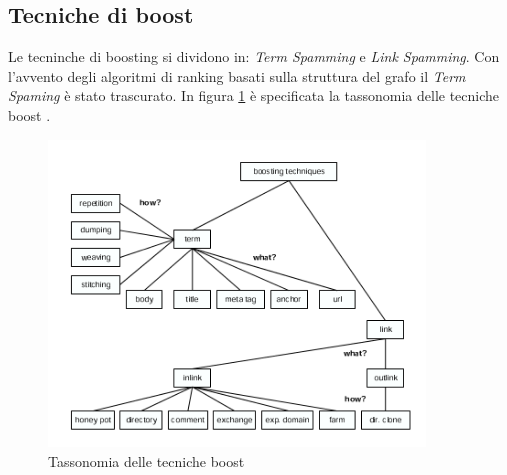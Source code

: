 \subsection{Tecniche di boost}
Le tecninche di boosting si dividono in: \textit{Term Spamming} e \textit{Link Spamming}. Con l'avvento degli algoritmi di ranking basati sulla struttura del grafo il \textit{Term Spaming} è stato trascurato. In figura \ref{fig:tassonomiaTecnicheBoost} è specificata la tassonomia delle tecniche boost \cite{ilprints646}.
\begin{figure} 
 \centering
 \includegraphics[width=10cm]{immagini/tassonomiaTecnicheBoost}
 \caption{Tassonomia delle tecniche boost}
 \label{fig:tassonomiaTecnicheBoost}
\end{figure}


